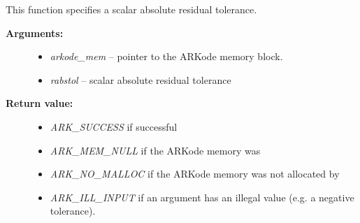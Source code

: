 \documentclass[letterpaper,10pt,english]{sphinxmanual}
\begin{document}
\begin{fulllineitems}
\label{c_interface/User_callable:c.ARKodeResStolerance}
This function specifies a scalar absolute residual tolerance.
\begin{description}
\item[{\textbf{Arguments:}}] \leavevmode\begin{itemize}
\item {} 
\emph{arkode\_mem} -- pointer to the ARKode memory block.

\item {} 
\emph{rabstol} -- scalar absolute residual tolerance

\end{itemize}

\item[{\textbf{Return value:}}] \leavevmode\begin{itemize}
\item {} 
\emph{ARK\_SUCCESS} if successful

\item {} 
\emph{ARK\_MEM\_NULL}  if the ARKode memory was 

\item {} 
\emph{ARK\_NO\_MALLOC}  if the ARKode memory was not allocated by {\hyperref[c_interface/User_callable:c.ARKodeInit]{\emph{}}}

\item {} 
\emph{ARK\_ILL\_INPUT} if an argument has an illegal value (e.g. a negative tolerance).

\end{itemize}

\end{description}

\end{fulllineitems}

\end{document}
